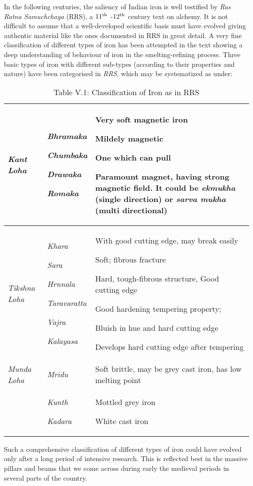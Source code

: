 In the following centuries, the saliency of Indian iron is well testified by {\it Ras Ratna Samuchchaya} (RRS), a $11^{\rm th}$ -$12^{\rm th}$ century text on alchemy. It is not difficult to assume that a well-developed scientific basis must have evolved giving authentic material like the ones documented in RRS in great detail. A very fine classification of different types of iron has been attempted in the text showing a deep understanding of behaviour of iron in the smelting-refining process. Three basic types of iron with different sub-types (according to their properties and nature) have been categorised in {\it RRS}, which may be systematized as under:
\newpage
{\fontsize{8}{10}\selectfont
\begin{longtable}{|p{.8cm}|p{1.3cm}|p{5.6cm}|}
\caption{Table V.1: Classification of Iron as in RRS}\label{table V.1}\\
\hline
{\it Kant Loha} & {\it Bhramaka}\par  {\it Chumbaka}\par {\it Drawaka}\par {\it Romaka} & Very soft magnetic iron\par Mildely magnetic\par One which can pull\par Paramount magnet, having strong magnetic field. It could be {\it ekmukha} (single direction) or {\it sarva mukha}  (multi directional)\\
\hline
{\it Tikshna Loha} & {\it Khara} \par {\it Sara}\par {\it Hrnnala}\par {\it Taravaratta} \par {\it Vajra }\par {\it Kalayasa} & 
With good cutting edge, may break easily \par Soft; fibrous fracture \par Hard, tough-fibrous structure, Good cutting edge \par Good hardening tempering property; \par Bluish in hue and hard cutting edge \par Develops hard cutting edge after tempering\\
\hline
{\it Munda Loha} & {\it Mridu} & Soft brittle, may be grey cast iron, has low melting point\\
& {\it Kunth} \par {\it Kadara} & Mottled grey iron \par White cast iron\\
\hline
\end{longtable}
}
Such a comprehensive classification of different types of iron could have evolved only after a long period of intensive research. This is reflected best in the massive pillars and beams that we come across during early the medieval periods in several parts of the country.

